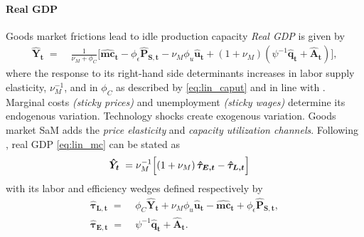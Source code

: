 \documentclass[12pt,3p,authoryear,review]{elsarticle}
\begin{document}
\paragraph{Real GDP}%
Goods market frictions lead to idle production capacity \emph{Real GDP} is given by%
\begin{align}\label{eq:lin_mc}%
	\boldsymbol{\hat{Y}_{t}} \; = & \; \frac{1}{\nu_M+\phi_C} \Biggl[ \boldsymbol{\hat{mc}_t} - \phi_\epsilon \boldsymbol{\hat{P}_{S,t}} - \nu_M \phi_u \boldsymbol{\hat{u}_t} + \left(1+\nu_M\right) \left( \psi^{-1} \boldsymbol{\hat{q}_t} + \boldsymbol{\hat{A}_t} \right) \Biggr],%
\end{align}%
where the response to its right-hand side determinants increases in labor supply elasticity, $\nu_M^{-1}$, and in $\phi_C$ as described by \eqref{eq:lin_caput} and in line with \cite{lesterHomeProductionSticky2014}. Marginal costs \emph{(sticky prices)} and unemployment \emph{(sticky wages)} determine its endogenous variation. Technology shocks create exogenous variation. Goods market SaM adds the \emph{price elasticity} and \emph{capacity utilization channels}. Following \cite{chari2007business}, real GDP \eqref{eq:lin_mc} can be stated as%
\begin{align*}%
	\boldsymbol{\hat{Y}_{t}} \; = & \; \nu_M^{-1} \Bigl[ \left(1+\nu_M\right) \boldsymbol{\hat{\tau}_{E,t}} - \boldsymbol{\hat{\tau}_{L,t}} \Bigr]%
\end{align*}%
with its labor and efficiency wedges defined respectively by%
\begin{align}%
	\boldsymbol{\hat{\tau}_{L,t}} \; = & \; \phi_C \boldsymbol{\hat{Y}_{t}} + \nu_M \phi_u \boldsymbol{\hat{u}_t} - \boldsymbol{\hat{mc}_t} + \phi_\epsilon \boldsymbol{\hat{P}_{S,t}},\label{eq:labor_wedge}\\%
	\boldsymbol{\hat{\tau}_{E,t}} \; = & \; \psi^{-1} \boldsymbol{\hat{q}_t} + \boldsymbol{\hat{A}_t}.\label{eq:efficiency_wedge}%
\end{align}%
\end{document}
